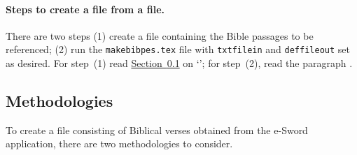 \documentclass{article}
\begin{document}
    \paragraph*{Steps to create a  file from a  file.}
    There are two steps (1) create a  file containing the Bible
    passages to be referenced; (2) run the \texttt{makebibpes.tex} file with
    \texttt{txtfilein} and \texttt{deffileout} set as desired. For step~(1)
    read \hyperref[s:Methods]{Section~\ref*{s:Methods}} on
    `'; for step~(2), read the
    paragraph .

     \subsection{Methodologies}\label{s:Methods}

    To create a  file consisting of Biblical verses obtained from the \textsf{e-Sword}
    application, there are two methodologies to consider.
\end{document}
